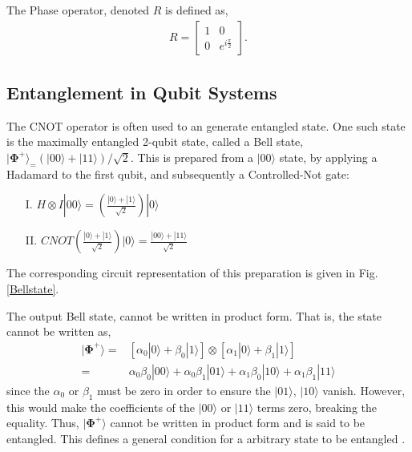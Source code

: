 The Phase operator, denoted $R$ is defined as,
\begin{align*}
    R =
    \begin{bmatrix}
        1 & 0                  \\
        0 & e^{i\frac{\pi}{2}}
    \end{bmatrix}.
\end{align*}

\subsection{Entanglement in Qubit Systems}

The CNOT operator is often used to an generate entangled state. One such state is the maximally entangled 2-qubit state,
called a Bell state, $|{\bm\Phi}^{+}\rangle_ = (|00\rangle + |11\rangle)/\sqrt{2}$. This is prepared
from a $|00\rangle$ state, by applying a Hadamard to the first qubit, and subsequently a Controlled-Not gate:
\begin{itemize}
    \item[I.] $H \otimes I |00\rangle = \left (\frac{|0\rangle + |1\rangle }{\sqrt{2}}\right )|0\rangle$ 
    \item[II.]  $CNOT \left (\frac{|0\rangle + |1\rangle }{\sqrt{2}}\right )|0\rangle = \frac{|00\rangle + |11\rangle}{\sqrt{2}}$
\end{itemize}
The corresponding circuit representation of this preparation is given in Fig. \ref{Bellstate}.


The output Bell state, cannot be written in product form. That is, the state cannot be written as,
\begin{align*}
    |{\bm\Phi}^+\rangle = & \left[ \alpha_0 |0\rangle + \beta_0|1\rangle\right] \otimes \left[\alpha_1 |0\rangle + \beta_1|1\rangle\right] \\
    =                     & \alpha_0\beta_0 |00\rangle + \alpha_0\beta_1|01\rangle + \alpha_1\beta_0|10\rangle + \alpha_1\beta_1|11\rangle
\end{align*}
since the $\alpha_0$ or $\beta_1$ must be zero in order to ensure the $|01\rangle$, $|10\rangle$ vanish.
However, this would make the coefficients of the $|00\rangle$
or $|11\rangle$ terms zero, breaking the equality. Thus, $|{\bm\Phi}^+\rangle$ cannot be written in
product form and is said to be entangled. This defines a general condition for a arbitrary state to be entangled 
\cite{nielsen_chuang_2010}.


